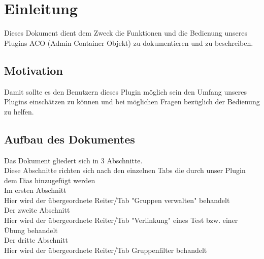 \chapter{Einleitung}
Dieses Dokument dient dem Zweck die Funktionen und die Bedienung unseres Plugins ACO (Admin Container Objekt) zu dokumentieren und zu beschreiben.  

\section*{Motivation}
Damit sollte es den Benutzern dieses Plugin möglich sein den Umfang unseres Plugins einschätzen zu können und bei möglichen Fragen bezüglich der Bedienung zu helfen.  

\section*{Aufbau des Dokumentes}
Das Dokument gliedert sich in 3 Abschnitte.\\
Diese Abschnitte richten sich nach den einzelnen Tabs die durch unser Plugin dem Ilias hinzugefügt werden
\\
Im ersten Abschnitt \\
Hier wird der übergeordnete Reiter/Tab "Gruppen verwalten" behandelt
\\
Der zweite Abschnitt \\
Hier wird der übergeordnete Reiter/Tab "Verlinkung" eines Test bzw. einer Übung behandelt 
\\
Der dritte Abschnitt \\
Hier wird der übergeordnete Reiter/Tab Gruppenfilter behandelt 
